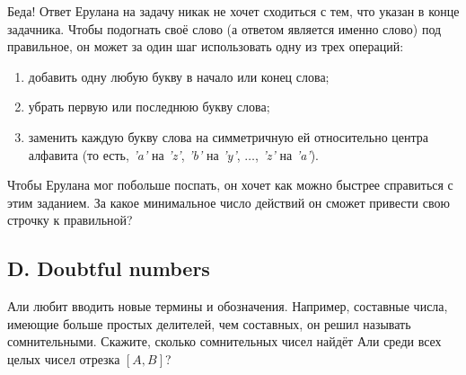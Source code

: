 Беда! Ответ Ерулана на задачу никак не хочет сходиться с тем, что указан в конце задачника. Чтобы подогнать своё слово (а ответом является именно слово) под правильное, он может за один шаг использовать одну из трех операций:
\begin{enumerate}
\item добавить одну любую букву в начало или конец слова;
\item убрать первую или последнюю букву слова;
\item заменить каждую букву слова на симметричную ей относительно центра алфавита (то есть, \textit{'a'} на \textit{'z'}, \textit{'b'} на \textit{'y'}, $\dots$, \textit{'z'} на \textit{'a'}).
\end{enumerate}
Чтобы Ерулана мог побольше поспать, он хочет как можно быстрее справиться с этим заданием. За какое минимальное число действий он сможет привести свою строчку к правильной?







\subsection*{D. Doubtful numbers}

Али любит вводить новые термины и обозначения. Например, составные числа, имеющие больше простых делителей, чем составных, он решил называть сомнительными. Скажите, сколько сомнительных чисел найдёт Али среди всех целых чисел отрезка $[A, B]$?




